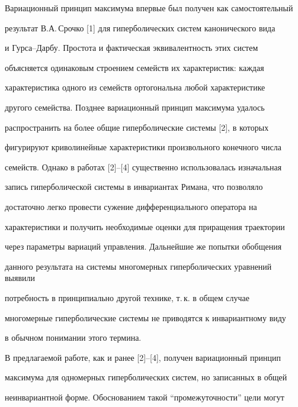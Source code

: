 \maketitle


\label{begin}








Вариационный принцип максимума впервые был получен как самостоятельный


результат В.А.\,Срочко [1] для гиперболических систем канонического вида


и Гурса--Дарбу. Простота и фактическая эквивалентность этих систем


объясняется одинаковым строением семейств их характеристик: каждая


характеристика одного из семейств ортогональна любой характеристике


другого семейства. Позднее вариационный принцип максимума удалось


распространить на более общие гиперболические системы [2], в которых


фигурируют криволинейные характеристики произвольного конечного числа


семейств. Однако в работах [2]--[4] существенно использовалась изначальная


запись гиперболической системы в инвариантах Римана, что позволяло


достаточно легко провести сужение дифференциального оператора на


характеристики и получить необходимые оценки для приращения траектории


через параметры вариаций управления. Дальнейшие же попытки обобщения


данного результата на системы многомерных гиперболических уравнений выявили


потребность в принципиально другой технике, т.\,к. в общем случае


многомерные гиперболические системы не приводятся к инвариантному виду


в обычном понимании этого термина.





В предлагаемой работе, как и ранее [2]--[4], получен вариационный принцип


максимума для одномерных гиперболических систем, но записанных в общей


неинвариантной форме. Обоснованием такой ``промежуточности'' цели могут


